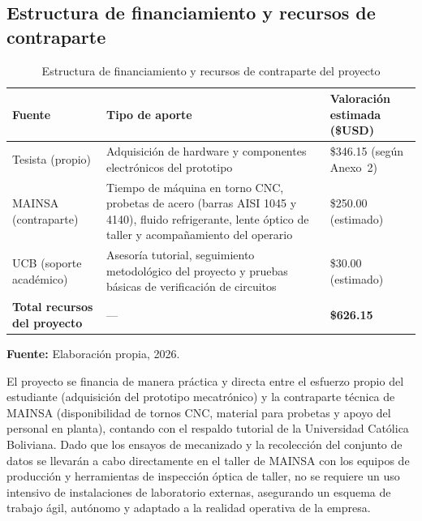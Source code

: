 \subsection{Estructura de financiamiento y recursos de contraparte}

\begin{table}[H]
\centering
\caption{Estructura de financiamiento y recursos de contraparte del proyecto}
\label{tab:financiamiento}
\vspace{1.0mm}
{\small
{}
\setlength{\tabcolsep}{4pt}
\renewcommand{\arraystretch}{1.1}
\begin{tabular}{|L{3.8cm}|L{7.0cm}|R{2.5cm}|}
\hline
\textbf{Fuente} & \textbf{Tipo de aporte} & \textbf{Valoración estimada (\$USD)} \\ \hline \hline
Tesista (propio) & Adquisición de hardware y componentes electrónicos del prototipo & \$346.15 (según Anexo~2) \\ \hline
MAINSA (contraparte) & Tiempo de máquina en torno CNC, probetas de acero (barras AISI 1045 y 4140), fluido refrigerante, lente óptico de taller y acompañamiento del operario & \$250.00 (estimado) \\ \hline
UCB (soporte académico) & Asesoría tutorial, seguimiento metodológico del proyecto y pruebas básicas de verificación de circuitos & \$30.00 (estimado) \\ \hline
\textbf{Total recursos del proyecto} & --- & \textbf{\$626.15} \\ \hline
\end{tabular}
}
\vspace{1.5mm}
\small \textbf{Fuente:} Elaboración propia, 2026.
\end{table}

El proyecto se financia de manera práctica y directa entre el esfuerzo propio del estudiante (adquisición del prototipo mecatrónico) y la contraparte técnica de MAINSA (disponibilidad de tornos CNC, material para probetas y apoyo del personal en planta), contando con el respaldo tutorial de la Universidad Católica Boliviana. Dado que los ensayos de mecanizado y la recolección del conjunto de datos se llevarán a cabo directamente en el taller de MAINSA con los equipos de producción y herramientas de inspección óptica de taller, no se requiere un uso intensivo de instalaciones de laboratorio externas, asegurando un esquema de trabajo ágil, autónomo y adaptado a la realidad operativa de la empresa.
